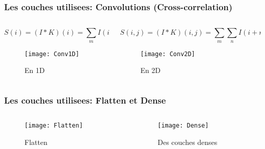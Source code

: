 \begin{frame}
    \frametitle{Les couches utilisees: Convolutions (Cross-correlation)}
    \begin{columns}
        \begin{column}{0.5\textwidth}
            \scriptsize
            \begin{equation*}
                S(i) = (I * K)(i) = \sum_{m} I(i+m)K(m)
                \label{eqn:Corr2D}
            \end{equation*}
            \begin{figure}
                \texttt{[image: Conv1D]}
                \caption{En 1D \parencite{Reference10}}
            \end{figure}
        \end{column}
        \begin{column}{0.5\textwidth}
            \scriptsize
            \begin{equation*}
                S(i,j) = (I * K)(i,j) = \sum_{m}\sum_{n} I(i+m,j+n)K(m,n)
                \label{eqn:Corr2D}
            \end{equation*}
            \begin{figure}
                \texttt{[image: Conv2D]}
                \caption{En 2D \parencite{Reference11}}
            \end{figure}
        \end{column}
    \end{columns}
\end{frame}

\begin{frame}
    \frametitle{Les couches utilisees: Flatten et Dense}
    \begin{columns}
        \begin{column}{0.5\textwidth}
            \begin{figure}
                \texttt{[image: Flatten]}
                \caption{Flatten}
            \end{figure}
        \end{column}
        \begin{column}{0.5\textwidth}
            \begin{figure}
                \texttt{[image: Dense]}
                \caption{Des couches denses}
            \end{figure}
        \end{column}
    \end{columns}
\end{frame}


